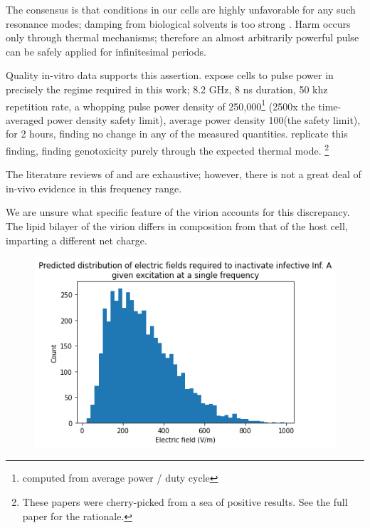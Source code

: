 \documentclass[fleqn,10pt]{paper}
\begin{document}
The consensus is that conditions in our cells are highly unfavorable for any such resonance modes; damping from biological solvents is too strong \cite{Vibrational2002}. Harm occurs only through thermal mechanisms; therefore an almost arbitrarily powerful pulse can be safely applied for infinitesimal periods.

Quality in-vitro data supports this assertion. \cite{Cytogenetic2006} expose cells to pulse power in precisely the regime required in this work; 8.2 GHz, 8 ns duration, 50 khz repetition rate, a whopping pulse power density of 250,000\Wsqm\footnote{computed from average power / duty cycle} (2500x the time-averaged power density safety limit), average power density 100\Wsqm (the safety limit), for 2 hours, finding no change in any of the measured quantities. \cite{DNA2004} replicate this finding, finding genotoxicity purely through the expected thermal mode. \footnote{These papers were cherry-picked from a sea of positive results. See the full paper for the rationale.}

The literature reviews of \cite{ICNIRP2020} and \cite{C95} are exhaustive; however, there is not a great deal of in-vivo evidence in this frequency range\cite{New2019}\cite{Comprehensive2018}.

We are unsure what specific feature of the virion accounts for this discrepancy. The lipid bilayer of the virion differs in composition from that of the host cell, imparting a different net charge.



\clearpage

\begin{figure}[H]
	\centering
	\includegraphics[width=\textwidth]{biology/output_35_1.png}
\end{figure}



\printbibliography[heading=none, title={}]
\end{document}
